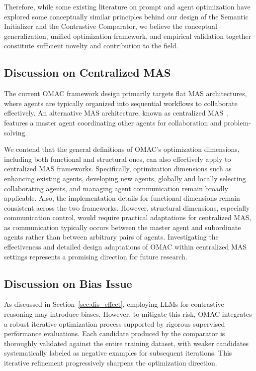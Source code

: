 Therefore, while some existing literature on prompt and agent optimization \cite{aflow, shinn2023reflexion} have explored some conceptually similar principles behind our design of  the {Semantic Initializer} and the {Contrastive Comparator},  we believe the conceptual generalization, unified optimization framework, and empirical validation together constitute sufficient novelty and contribution to the field.



\subsection{Discussion on Centralized MAS}



The current OMAC framework design primarily targets flat MAS architectures, where agents are typically organized into sequential workflows to collaborate effectively. An alternative MAS architecture, known as centralized MAS~\cite{li2025parallelized, chen2024scalable}, features a master agent coordinating other agents for collaboration and problem-solving.

We contend that the general definitions of OMAC’s optimization dimensions, including both functional and structural ones, can also effectively apply to centralized MAS frameworks. Specifically, optimization dimensions such as enhancing existing agents, developing new agents, globally and locally selecting collaborating agents, and managing agent communication remain broadly applicable. Also, the implementation details for functional dimensions remain consistent across the two frameworks. However, structural dimensions, especially communication control, would require practical adaptations for centralized MAS, as communication typically occurs between the master agent and subordinate agents rather than between arbitrary pairs of agents. Investigating the effectiveness and detailed design adaptations of OMAC within centralized MAS settings represents a promising direction for future research.



\subsection{Discussion on Bias Issue}


As discussed in Section~\ref{sec:dis_effect}, employing LLMs for contrastive reasoning may introduce biases. However, to mitigate this risk, OMAC integrates a robust iterative optimization process supported by rigorous supervised performance evaluations. Each candidate produced by the comparator is thoroughly validated against the entire training dataset, with weaker candidates systematically labeled as negative examples for subsequent iterations. This iterative refinement progressively sharpens the optimization direction.

